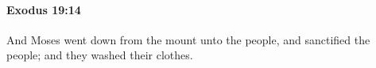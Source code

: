 
		\paragraph{Exodus 19:14} %
			\label{EXODUS-19-14}

			And Moses went down from the mount unto the people, and sanctified the people; and they washed their clothes.



